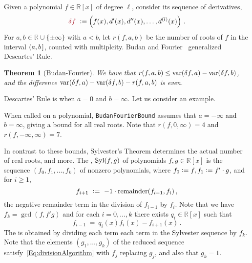 \documentclass[12pt]{amsart}
\newtheorem{theorem}{Theorem}
\theoremstyle{definition}
\newcommand{\RR}{\mathbb{R}}
\DeclareMathOperator{\var}{{\rm var}}
\DeclareMathOperator{\Syl}{{\rm Syl}}
\newcommand{\defcolor}[1]{{\color{Maroon}#1}}
\newcommand{\demph}[1]{\defcolor{{\sl #1}}}
\begin{document}
Given a polynomial $f\in\RR[x]$ of degree $\ell$, consider its sequence of derivatives,
%
 \[
   \defcolor{\delta f}\ \vcentcolon= \left(f(x),d'(x),d''(x),\dots,d^{(l)}(x)\right)\,.
 \]
%
For $a,b\in \RR\cup\{\pm \infty\}$ with $a<b$, let \defcolor{$r(f,a,b)$} be the number of roots of $f$ in the interval $(a,b\hspace{.05cm}]$, counted
with multiplcity.
Budan and Fourier~\cite[Ch.\ 2]{So_Book} generalized Descartes' Rule.

\begin{theorem}[Budan-Fourier]
  We have that $r(f,a,b)\leq \var(\delta f,a) -\var(\delta f,b)$, and the difference
  $\var(\delta f,a) -\var(\delta f,b)-r(f,a,b)$ is even. 
\end{theorem}

Descartes' Rule is when $a=0$ and $b=\infty$.
Let us consider an example.
%
\begin{leftbar}

\end{leftbar}
%
When called on a polynomial, \texttt{BudanFourierBound} assumes that $a=-\infty$ and $b=\infty$, giving a bound for all real roots.
Note that $r(f,0,\infty)=4$ and $r(f,-\infty,\infty)=7$.

In contrast to these bounds, 
Sylvester's Theorem determines the actual number of real roots, and more.
The \demph{Sylvester sequence}, \defcolor{$\Syl(f,g)$} of polynomials $f,g\in\RR[x]$ is the sequence
$\left(f_0,f_1,\dotsc,f_k\right)$ of nonzero polynomials, where $f_0\vcentcolon= f, f_1 \vcentcolon= f'\cdot g$,
and for $i\geq 1$, 
%
  \[
    f_{i+1}\ \vcentcolon=\ -1\cdot \mbox{remainder}(f_{i-1},f_i)\,,
  \]
%
the negative remainder term in the division of $f_{i-1}$ by $f_i$.
Note that we have $f_k = \gcd(f,f'g)$ and for each $i=0,\dotsc,k$ there exists $q_i\in\RR[x]$ such that
%
 \begin{equation}\label{Eq:divisionAlgorithm}
    f_{i-1}\ =\ q_i(x)f_i(x)-f_{i+1}(x)\,.
 \end{equation}
%
The \demph{reduced Sylvester sequence} is obtained by dividing each term each term in the Sylvester sequence by $f_k$.
Note that the elements $(g_1,\dotsc,g_k)$ of the reduced sequence satisfy~\eqref{Eq:divisionAlgorithm} with $f_j$ replacing $g_j$, and also
that $g_k=1$.
\end{document}
